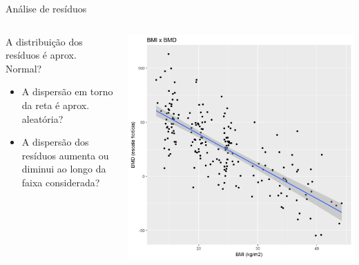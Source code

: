\documentclass{beamer}
\begin{document}
\begin{frame}{Análise de resíduos}
  \begin{columns}
    \begin{column}{5cm}
      A distribuição dos resíduos é aprox. Normal?
      \bigskip
      \begin{itemize}
        \footnotesize
      \item A dispersão em torno da reta é aprox. aleatória?
        \bigskip
      \item A dispersão dos resíduos aumenta ou diminui ao longo da faixa considerada?
      \end{itemize}
    \end{column}
    \begin{column}{5cm}
      \begin{center}
        \includegraphics[width=1.1\textwidth]{Cap18-19/pratica-plot2}
      \end{center}
    \end{column}
  \end{columns}
\end{frame}
\end{document}
